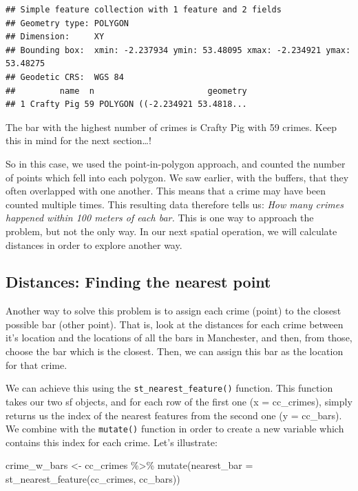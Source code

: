 \documentclass[
]{book}
\newenvironment{Shaded}{\begin{snugshade}}{\end{snugshade}}
\newcommand{\AttributeTok}[1]{\textcolor[rgb]{0.77,0.63,0.00}{#1}}
\newcommand{\FunctionTok}[1]{\textcolor[rgb]{0.00,0.00,0.00}{#1}}
\newcommand{\NormalTok}[1]{#1}
\newcommand{\OtherTok}[1]{\textcolor[rgb]{0.56,0.35,0.01}{#1}}
\newcommand{\SpecialCharTok}[1]{\textcolor[rgb]{0.00,0.00,0.00}{#1}}
\begin{document}
\begin{verbatim}
## Simple feature collection with 1 feature and 2 fields
## Geometry type: POLYGON
## Dimension:     XY
## Bounding box:  xmin: -2.237934 ymin: 53.48095 xmax: -2.234921 ymax: 53.48275
## Geodetic CRS:  WGS 84
##         name  n                       geometry
## 1 Crafty Pig 59 POLYGON ((-2.234921 53.4818...
\end{verbatim}

The bar with the highest number of crimes is Crafty Pig with 59 crimes. Keep this in mind for the next section\ldots!

So in this case, we used the point-in-polygon approach, and counted the number of points which fell into each polygon. We saw earlier, with the buffers, that they often overlapped with one another. This means that a crime may have been counted multiple times. This resulting data therefore tells us: \emph{How many crimes happened within 100 meters of each bar.} This is one way to approach the problem, but not the only way. In our next spatial operation, we will calculate distances in order to explore another way.

\hypertarget{distances-finding-the-nearest-point}{%
\subsection{Distances: Finding the nearest point}\label{distances-finding-the-nearest-point}}

Another way to solve this problem is to assign each crime (point) to the closest possible bar (other point). That is, look at the distances for each crime between it's location and the locations of all the bars in Manchester, and then, from those, choose the bar which is the closest. Then, we can assign this bar as the location for that crime.

We can achieve this using the \texttt{st\_nearest\_feature()} function. This function takes our two sf objects, and for each row of the first one (x = cc\_crimes), simply returns us the index of the nearest features from the second one (y = cc\_bars). We combine with the \texttt{mutate()} function in order to create a new variable which contains this index for each crime. Let's illustrate:

\begin{Shaded}
\begin{Highlighting}[]
\NormalTok{crime\_w\_bars }\OtherTok{\textless{}{-}}\NormalTok{ cc\_crimes }\SpecialCharTok{\%\textgreater{}\%} 
  \FunctionTok{mutate}\NormalTok{(}\AttributeTok{nearest\_bar =} \FunctionTok{st\_nearest\_feature}\NormalTok{(cc\_crimes, cc\_bars))}
\end{Highlighting}
\end{Shaded}
\end{document}
